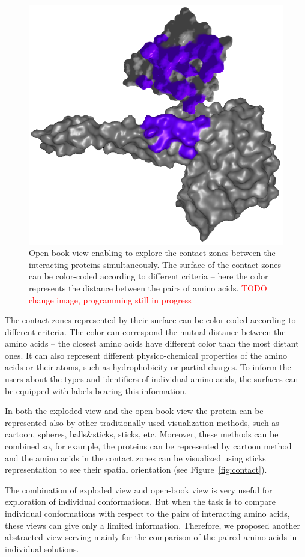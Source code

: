 \documentclass[journal]{vgtc}                %
\begin{document}
\begin{figure}[bt]
  \centering
  \includegraphics[width=0.8\columnwidth]{book.png}
  \caption{Open-book view enabling to explore the contact zones between the interacting proteins simultaneously. The surface of the contact zones can be color-coded according to different criteria -- here the color represents the distance between the pairs of amino acids. \textcolor{red}{TODO change image, programming still in progress}}
  \label{fig:book}
\end{figure}

The contact zones represented by their surface can be color-coded according to different criteria.
The color can correspond the mutual distance between the amino acids -- the closest amino acids have different color than the most distant ones.
It can also represent different physico-chemical properties of the amino acids or their atoms, such as hydrophobicity or partial charges.
To inform the users about the types and identifiers of individual amino acids, the surfaces can be equipped with labels bearing this information.

In both the exploded view and the open-book view the protein can be represented also by other traditionally used visualization methods, such as cartoon, spheres, balls\&sticks, sticks, etc.
Moreover, these methods can be combined so, for example, the proteins can be represented by cartoon method and the amino acids in the contact zones can be visualized using sticks representation to see their spatial orientation (see Figure~\ref{fig:contact}).

The combination of exploded view and open-book view is very useful for exploration of individual conformations.
But when the task is to compare individual conformations with respect to the pairs of interacting amino acids, these views can give only a limited information.
Therefore, we proposed another abstracted view serving mainly for the comparison of the paired amino acids in individual solutions.
\end{document}
